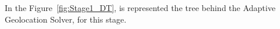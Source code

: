  In the Figure~\ref{fig:Stage1_DT}, is represented the tree behind the Adaptive Geolocation Solver, for this stage. 
 \newline\newline\newline 


